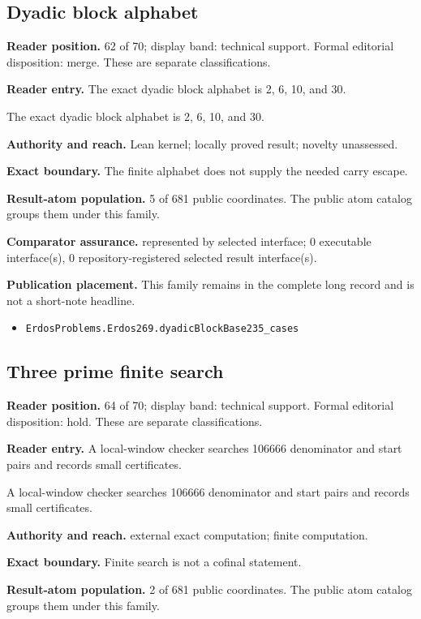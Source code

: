 \documentclass[11pt]{article}
\begin{document}
\subsection{Dyadic block alphabet}
\textbf{Reader position.} 62 of 70; display band: technical support.  Formal editorial disposition: merge.  These are separate classifications.

\textbf{Reader entry.} The exact dyadic block alphabet is 2, 6, 10, and 30.

The exact dyadic block alphabet is 2, 6, 10, and 30.

\textbf{Authority and reach.} Lean kernel; locally proved result; novelty unassessed.

\textbf{Exact boundary.} The finite alphabet does not supply the needed carry escape.

\textbf{Result-atom population.} 5 of 681 public coordinates. The public atom catalog groups them under this family.

\textbf{Comparator assurance.} represented by selected interface; 0 executable interface(s), 0 repository-registered selected result interface(s).

\textbf{Publication placement.} This family remains in the complete long record and is not a short-note headline.

\begin{itemize}
  \item \nolinkurl{ErdosProblems.Erdos269.dyadicBlockBase235_cases}
\end{itemize}

\subsection{Three prime finite search}
\textbf{Reader position.} 64 of 70; display band: technical support.  Formal editorial disposition: hold.  These are separate classifications.

\textbf{Reader entry.} A local-window checker searches 106666 denominator and start pairs and records small certificates.

A local-window checker searches 106666 denominator and start pairs and records small certificates.

\textbf{Authority and reach.} external exact computation; finite computation.

\textbf{Exact boundary.} Finite search is not a cofinal statement.

\textbf{Result-atom population.} 2 of 681 public coordinates. The public atom catalog groups them under this family.
\end{document}
